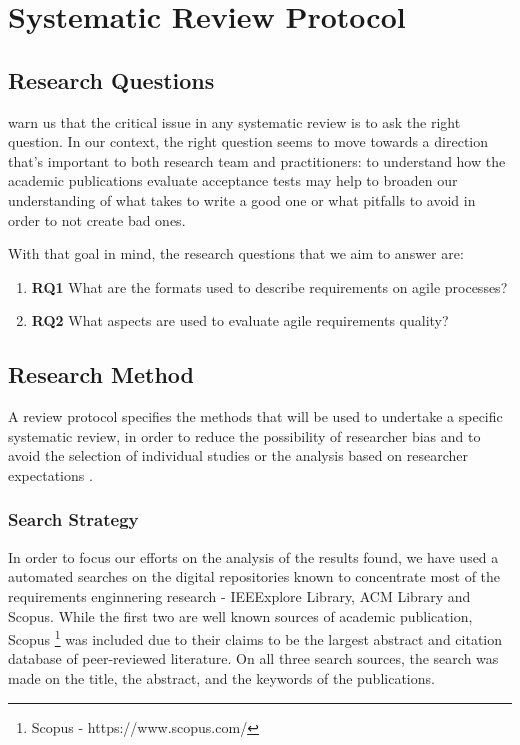 \chapter{\label{chap:chap4}Systematic Review Protocol}

\section{Research Questions}

\cite{Kitchenham_2007} warn us that the critical issue in any systematic review is to ask the right question. In our context, the right question seems to move towards a direction that's important to both research team and practitioners: to understand how the academic publications evaluate acceptance tests may help to broaden our understanding of what takes to write a good one or what pitfalls to avoid in order to not create bad ones.

With that goal in mind, the research questions that we aim to answer are:

\begin{enumerate}[label={}]
    \item \textbf{RQ1} What are the formats used to describe requirements on agile processes?
    \item \textbf{RQ2} What aspects are used to evaluate agile requirements quality?
\end{enumerate}

\section{Research Method}

A review protocol specifies the methods that will be used to undertake a specific systematic review, in order to reduce the possibility of researcher bias and to avoid the selection of individual studies or the analysis based on researcher expectations \cite{Kitchenham_2007}.

\subsection{Search Strategy}

In order to focus our efforts on the analysis of the results found, we have used a automated searches on the digital repositories known to concentrate most of the requirements enginnering research - IEEExplore Library, ACM Library and Scopus. While the first two are well known sources of academic publication, Scopus \footnote{Scopus - https://www.scopus.com/} was included due to their claims to be the largest abstract and citation database of peer-reviewed literature. On all three search sources, the search was made on the title, the abstract, and the keywords of the publications.

